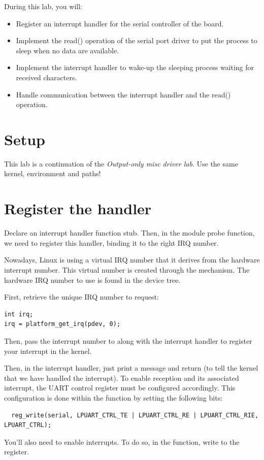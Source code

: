 
During this lab, you will:

\begin{itemize}
\item Register an interrupt handler for the serial controller of the
  board.
\item Implement the read() operation of the serial port driver to put
  the process to sleep when no data are available.
\item Implement the interrupt handler to wake-up the sleeping process
  waiting for received characters.
\item Handle communication between the interrupt handler and the
  read() operation.
\end{itemize}

\section{Setup}

This lab is a continuation of the {\em Output-only misc driver
lab}. Use the same kernel, environment and paths!

\section{Register the handler}

Declare an interrupt handler function stub. Then, in the module probe
function, we need to register this handler, binding it to the right
IRQ number.

Nowadays, Linux is using a virtual IRQ number that it derives from the
hardware interrupt number. This virtual number is created through the
 mechanism. The hardware IRQ number to use is found in
the device tree.

First, retrieve the unique IRQ number to request:

\begin{verbatim}
int irq;
irq = platform_get_irq(pdev, 0);
\end{verbatim}

Then, pass the interrupt number to  along
with the interrupt handler to register your interrupt in the kernel.

Then, in the interrupt handler, just print a message and return
 (to tell the kernel that we have handled the
interrupt).
\if{}
To enable reception and its associated interrupt, the UART control register must be configured accordingly. This configuration is done within the  function by setting the following bits:
\begin{verbatim}
  reg_write(serial, LPUART_CTRL_TE | LPUART_CTRL_RE | LPUART_CTRL_RIE, LPUART_CTRL);
\end{verbatim}
\else
You'll also need to enable interrupts.
To do so, in the  function, write
 to the  register.
\fi

